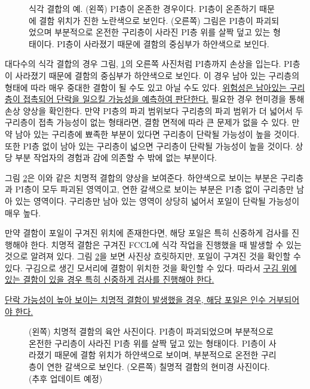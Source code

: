 \begin{figure}[htb]
  \centering
  \caption[식각 결합의 예]{식각 결합의 예. (왼쪽) PI층이 온존한 경우이다. PI층이 온존하기 때문에 결함 위치가 진한 노란색으로 보인다. (오른쪽) 그림은 PI층이 파괴되었으며 부분적으로 온전한 구리층이 사라진 PI층 위를 살짝 덮고 있는 형태이다. PI층이 사라졌기 때문에 결함의 중심부가 하얀색으로 보인다.}
  \label{fig:example_defect}
  \end{figure}

대다수의 식각 결합의 경우 그림, \ref{fig:example_defect}의 오른쪽 사진처럼 PI층까지 손상을 입는다. PI층이 사라졌기 때문에 결함의 중심부가 하얀색으로 보인다. 이 경우 남아 있는 구리층의 형태에 따라 매우 중대한 결함이 될 수도 있고 아닐 수도 있다. \uline{위험성은 남아있는 구리층이 접촉되어 단락을 일으킬 가능성을 예측하여 판단한다.} 필요한 경우 현미경을 통해 손상 양상을 확인한다.  만약 PI층의 파괴 범위보다 구리층의 파괴 범위가 더 넓어서 두 구리층이 접촉 가능성이 없는 형태라면, 결함 면적에 따라 큰 문제가 없을 수 있다. 만약 남아 있는 구리층에 뾰족한 부분이 있다면 구리층이 단락될 가능성이 높을 것이다. 또한 PI층 없이 남아 있는 구리층이 넓으면 구리층이 단락될 가능성이 높을 것이다. 상당 부분 작업자의 경험과 감에 의존할 수 밖에 없는 부분이다.

그림 \ref{fig:defect_bad_zoom}은 이와 같은 치명적 결합의 양상을 보여준다. 하얀색으로 보이는 부분은 구리층과  PI층이 모두 파괴된 영역이고, 연한 갈색으로 보이는 부분은 PI층 없이 구리층만 남아 있는 영역이다. 구리층만 남아 있는 영역이 상당히 넓어서 포일이 단락될 가능성이 매우 높다.

만약 결함이 포일이 구겨진 위치에 존재한다면, 해당 포일은 특히 신중하게 검사를 진행해야 한다. 치명적 결함은 구겨진 FCCL에 식각 작업을 진행했을 때 발생할 수 있는 것으로 알려져 있다. 그림 \ref{fig:defect_bad_zoom}을 보면 사진상 흐릿하지만, 포일이 구겨진 것을 확인할 수 있다. 구김으로 생긴 모서리에 결함이 위치한 것을 확인할 수 있다. 따라서 \uline{구김 위에 있는 결함이 있을 경우 특히 신중하게 검사를 진행해야 한다.}

\uline{단락 가능성이 높아 보이는 치명적 결함이 발생했을 경우, 해당 포일은 인수 거부되어야 한다.}

\begin{figure}[htb]
  \centering
  \caption[치명적 식각 결함의 양상]{(왼쪽) 치명적 결함의 육안 사진이다. PI층이 파괴되었으며 부분적으로 온전한 구리층이 사라진 PI층 위를 살짝 덮고 있는 형태이다. PI층이 사라졌기 때문에 결함 위치가 하얀색으로 보이며, 부분적으로 온전한 구리층이 연한 갈색으로 보인다. (오른쪽) 칠명적 결함의  현미경 사진이다. (추후 업데이트 예정)}
  \label{fig:defect_bad_zoom}
    \end{figure}

